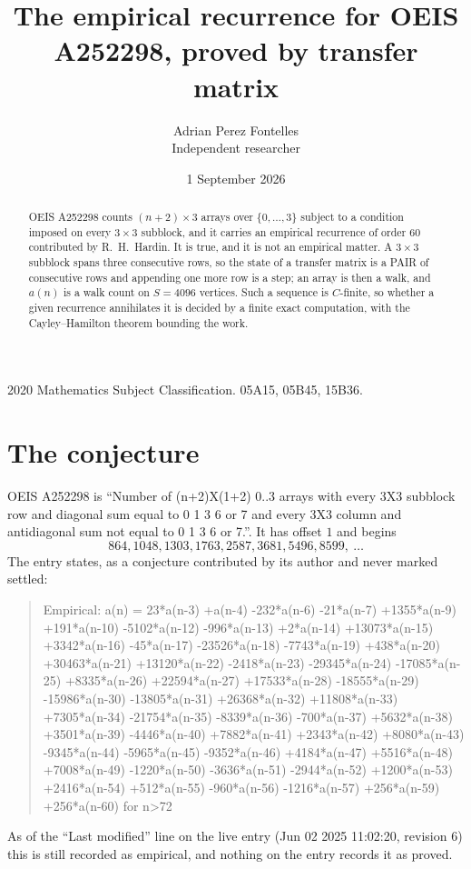 \documentclass[11pt,a4paper]{article}
\title{The empirical recurrence for OEIS A252298, proved by transfer matrix}
\author{Adrian Perez Fontelles\\ \small Independent researcher}
\date{1 September 2026}
\theoremstyle{plain}
\theoremstyle{definition}
\begin{document}
\maketitle

\begin{abstract}
OEIS A252298 counts $(n+2)\times3$ arrays over $\{0,\dots,3\}$ subject to a condition imposed on
every $3\times3$ subblock, and it carries an empirical recurrence of order $60$
contributed by R.~H.~Hardin. It is true, and it is not an empirical matter. A $3\times3$
subblock spans three consecutive rows, so the state of a transfer matrix is a PAIR of
consecutive rows and appending one more row is a step; an array is then a walk, and
$a(n)$ is a walk count on $S=4096$ vertices. Such a sequence is $C$-finite, so whether a given
recurrence annihilates it is decided by a finite exact computation, with the Cayley--Hamilton
theorem bounding the work.
\end{abstract}

\noindent\small 2020 Mathematics Subject Classification. 05A15, 05B45, 15B36.\normalsize

\section{The conjecture}

OEIS A252298 is ``Number of (n+2)X(1+2) 0..3 arrays with every 3X3 subblock row and diagonal sum equal to 0 1 3 6 or 7 and every 3X3 column and antidiagonal sum not equal to 0 1 3 6 or 7.''. It has offset $1$ and begins
\[
864, 1048, 1303, 1763, 2587, 3681, 5496, 8599,\ \dots
\]
The entry states, as a conjecture contributed by its author and never marked settled:
\begin{quote}
Empirical: a(n) = 23*a(n-3) +a(n-4) -232*a(n-6) -21*a(n-7) +1355*a(n-9) +191*a(n-10) -5102*a(n-12) -996*a(n-13) +2*a(n-14) +13073*a(n-15) +3342*a(n-16) -45*a(n-17) -23526*a(n-18) -7743*a(n-19) +438*a(n-20) +30463*a(n-21) +13120*a(n-22) -2418*a(n-23) -29345*a(n-24) -17085*a(n-25) +8335*a(n-26) +22594*a(n-27) +17533*a(n-28) -18555*a(n-29) -15986*a(n-30) -13805*a(n-31) +26368*a(n-32) +11808*a(n-33) +7305*a(n-34) -21754*a(n-35) -8339*a(n-36) -700*a(n-37) +5632*a(n-38) +3501*a(n-39) -4446*a(n-40) +7882*a(n-41) +2343*a(n-42) +8080*a(n-43) -9345*a(n-44) -5965*a(n-45) -9352*a(n-46) +4184*a(n-47) +5516*a(n-48) +7008*a(n-49) -1220*a(n-50) -3636*a(n-51) -2944*a(n-52) +1200*a(n-53) +2416*a(n-54) +512*a(n-55) -960*a(n-56) -1216*a(n-57) +256*a(n-59) +256*a(n-60) for n>72
\end{quote}
As of the ``Last modified'' line on the live entry (Jun 02 2025 11:02:20, revision 6) this is still
recorded as empirical, and nothing on the entry records it as proved.
\end{document}
